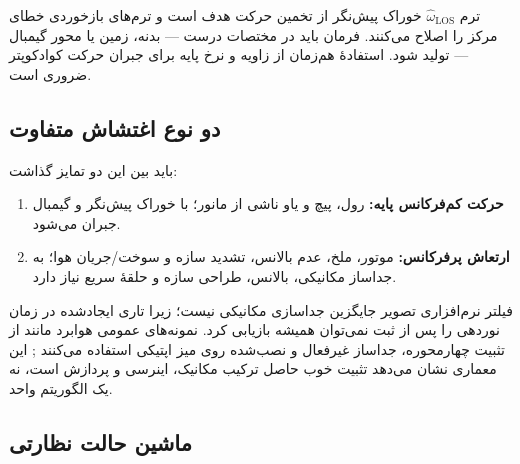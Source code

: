\documentclass[12pt,a4paper]{article}
\newcommand{\EN}[1]{\lr{#1}}
\begin{document}
ترم $\widehat{\omega}_{\mathrm{LOS}}$ خوراک پیش‌نگر از تخمین حرکت هدف است و ترم‌های بازخوردی خطای مرکز را اصلاح می‌کنند. فرمان باید در مختصات درست --- بدنه، زمین یا محور گیمبال --- تولید شود. استفادهٔ هم‌زمان از زاویه و نرخ پایه برای جبران حرکت کوادکوپتر ضروری است.

\subsection{دو نوع اغتشاش متفاوت}

باید بین این دو تمایز گذاشت:

\begin{enumerate}
    \item \textbf{حرکت کم‌فرکانس پایه:} رول، پیچ و یاو ناشی از مانور؛ با خوراک پیش‌نگر \EN{IMU} و گیمبال جبران می‌شود.
    \item \textbf{ارتعاش پرفرکانس:} موتور، ملخ، عدم بالانس، تشدید سازه و سوخت/جریان هوا؛ به جداساز مکانیکی، بالانس، طراحی سازه و حلقهٔ سریع نیاز دارد.
\end{enumerate}

فیلتر نرم‌افزاری تصویر جایگزین جداسازی مکانیکی نیست؛ زیرا تاری ایجادشده در زمان نوردهی را پس از ثبت نمی‌توان همیشه بازیابی کرد. نمونه‌های عمومی هوابرد مانند \EN{WESCAM MX-10} از تثبیت چهارمحوره، جداساز غیرفعال و \EN{IMU} نصب‌شده روی میز اپتیکی استفاده می‌کنند \cite{wescam}; این معماری نشان می‌دهد تثبیت خوب حاصل ترکیب مکانیک، اینرسی و پردازش است، نه یک الگوریتم واحد.

\subsection{ماشین حالت نظارتی}
\end{document}
